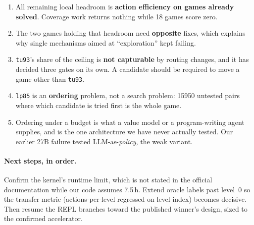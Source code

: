 \documentclass[11pt,a4paper]{article}
\begin{document}
\begin{enumerate}\itemsep2pt
  \item All remaining local headroom is \textbf{action efficiency on games already
  solved}. Coverage work returns nothing while 18 games score zero.
  \item The two games holding that headroom need \textbf{opposite} fixes, which explains
  why single mechanisms aimed at ``exploration'' kept failing.
  \item \texttt{tu93}'s share of the ceiling is \textbf{not capturable} by routing
  changes, and it has decided three gates on its own. A candidate should be required to
  move a game other than \texttt{tu93}.
  \item \texttt{lp85} is an \textbf{ordering} problem, not a search problem: 15950
  untested pairs where which candidate is tried first is the whole game.
  \item Ordering under a budget is what a value model or a program-writing agent
  supplies, and is the one architecture we have never actually tested. Our earlier 27B
  failure tested LLM-as-\emph{policy}, the weak variant.
\end{enumerate}

\paragraph{Next steps, in order.} Confirm the kernel's runtime limit, which is not stated
in the official documentation while our code assumes 7.5\,h. Extend oracle labels past
level~0 so the transfer metric (actions-per-level regressed on level index) becomes
decisive. Then resume the REPL branches toward the published winner's design, sized to
the confirmed accelerator.
\end{document}

